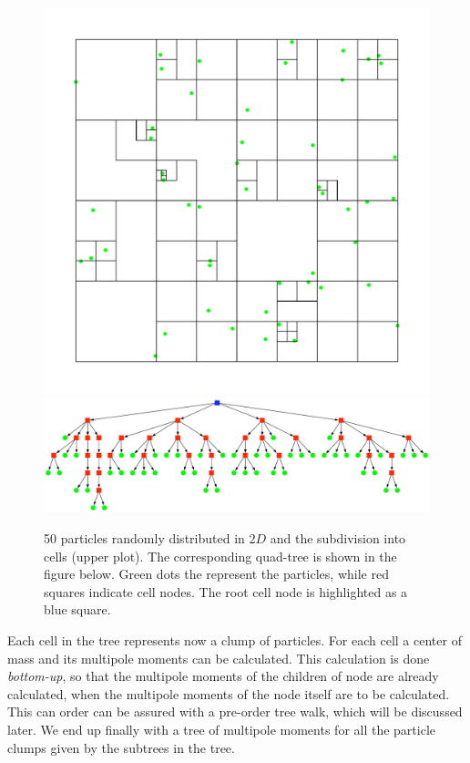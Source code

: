 \begin{figure}[htbp]
\begin{center}
\includegraphics[scale=0.6]{06quadtree50_xy.pdf}
\includegraphics[scale=0.3]{06quadtree50.pdf}
\caption{50 particles randomly distributed in $2D$ and the subdivision into cells (upper plot). The corresponding quad-tree is shown in the figure below. Green dots the represent the particles, while red squares indicate cell nodes. The root cell node is highlighted as a blue square.}
\label{ch02_grav02_fig02}
\end{center}
\end{figure}

Each cell in the tree represents now a clump of particles. For each cell a center of mass and its multipole moments can be calculated. This calculation is done \emph{bottom-up}, so that the multipole moments of the children of node are already calculated, when the multipole moments of the node itself are to be calculated. This can order can be assured with a pre-order tree walk, which will be discussed later. We end up finally with a tree of multipole moments for all the particle clumps given by the subtrees in the tree.

